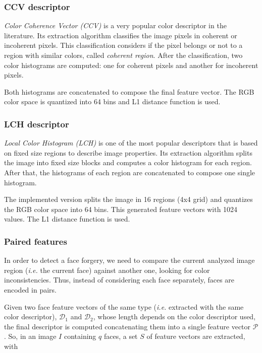 \subsubsection{CCV descriptor}

\emph{Color Coherence Vector (CCV)} \cite{pass1997comparing} is a very popular color descriptor in the literature. Its extraction algorithm classifies the image pixels in coherent or incoherent pixels. This classification considers if the pixel belongs or not to a region with similar colors, called \emph{coherent region}. After the classification, two color histograms are computed: one for coherent pixels and another for incoherent pixels.

Both histograms are concatenated to compose the final feature vector. The RGB color space is quantized into 64 bins and L1 distance function is used.

\subsubsection{LCH descriptor}

\emph{Local Color Histogram (LCH)} \cite{swain1991color} is one of the most popular descriptors that is based on fixed size regions to describe image properties. Its extraction algorithm splits the image into fixed size blocks and computes a color histogram for each region. After that, the histograms of each region
are concatenated to compose one single histogram. 

The implemented version splits the image in 16 regions (4x4 grid) and quantizes the RGB color space into 64 bins. This generated feature vectors with 1024 values. The L1 distance function is used.


\subsubsection{Paired features}

In order to detect a face forgery, we need to compare the current analyzed image region (\emph{i.e.} the current face) against another one, looking for color inconsistencies. Thus, instead of considering each face separately, faces are encoded in pairs.

Given two face feature vectors of the same type (\emph{i.e.} extracted with the same color descriptor), $\mathcal{D}_1$ and $\mathcal{D}_2$, whose length depends on the color descriptor used, the final descriptor is computed concatenating them into a single feature vector $\mathcal{P}$. So, in an image $I$ containing $q$ faces, a set $S$ of feature vectors are extracted, with

